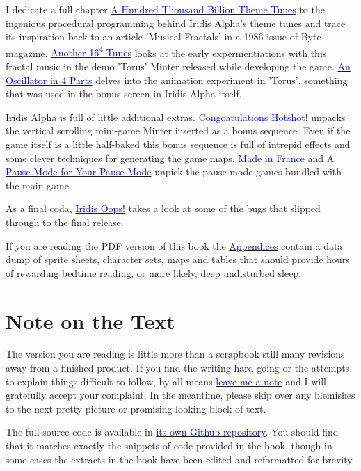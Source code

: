 I dedicate a full chapter \hyperref[sec:first16]{\textcolor{blue}{A Hundred Thousand Billion Theme Tunes}} to the ingenious procedural programming behind Iridis Alpha's theme
tunes and trace its inspiration back to an article 'Musical Fractals' in a 1986 issue of Byte magazine. \hyperref[sec:torusmusic]{\textcolor{blue}{Another 16\textsuperscript{4} Tunes}} looks
at the early expermentiations with this fractal music in the demo 'Torus' Minter released while developing the game. \hyperref[sec:torus]{\textcolor{blue}{An Oscillator in 4 Parts}} delves
into the animation experiment in 'Torus', something that was used in the bonus screen in Iridis Alpha itself.

Iridis Alpha is full of little additional extras. \hyperref[sec:bonus]{\textcolor{blue}{Congoatulations Hotshot!}} unpacks the vertical
scrolling mini-game Minter inserted as a bonus sequence. Even if the game itself is a little half-baked this bonus sequence is full of intrepid effects and some clever techniques
for generating the game maps. \hyperref[sec:mif]{\textcolor{blue}{Made in France}} and \hyperref[sec:dna]{\textcolor{blue}{A Pause Mode for Your Pause Mode}} unpick the pause mode games
bundled with the main game.

As a final coda, \hyperref[sec:bugs]{\textcolor{blue}{Iridis Oops!}} takes a look at some of the bugs that slipped through to the final release. 

If you are reading the PDF version of this book the \hyperref[sec:appendices]{\textcolor{blue}{Appendices}} contain a data dump of sprite sheets, character sets, maps and tables that 
should provide hours of rewarding bedtime reading, or more likely, deep undisturbed sleep.

\section*{Note on the Text}
The version you are reading is little more than a scrapbook still many revisions away from a
finished product. If you find the writing hard going or the attempts to explain things difficult
to follow, by all means \href{https://github.com/mwenge/iatheory/issues}{\textcolor{blue}{leave me a note}} and
I will gratefully accept your complaint. In the meantime, please skip over any blemishes
to the next pretty picture or promising-looking block of text.

The full source code is available in \href{https://github.com/mwenge/iridisalpha}{\textcolor{blue}{its own Github repository}}. 
You should find that it matches exactly the snippets of code provided in the book, though in some cases the extracts in the book have been edited
and reformatted for brevity.


